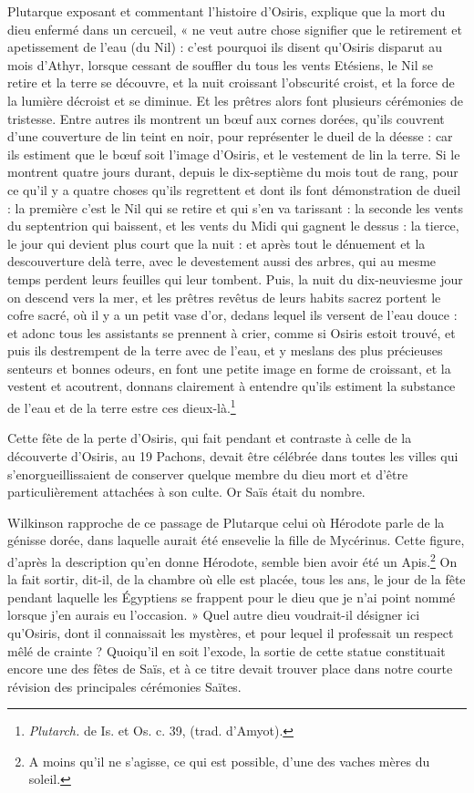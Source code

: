 \documentclass[a4paper, 11pt, oneside]{article}
\begin{document}
Plutarque exposant et commentant l'histoire d'Osiris, explique que la mort du dieu enfermé dans un cercueil, « ne veut autre chose signifier que le retirement et apetissement de l'eau (du Nil) : c'est pourquoi ils disent qu'Osiris disparut au mois d'Athyr, lorsque cessant de souffler du tous les vents Etésiens, le Nil se retire et la terre se découvre, et la nuit croissant l'obscurité croist, et la force de la lumière décroist et se diminue. Et les prêtres alors font plusieurs cérémonies de tristesse. Entre autres ils montrent un bœuf aux cornes dorées, qu'ils couvrent d'une couverture de lin teint en noir, pour représenter le dueil de la déesse : car ils estiment que le bœuf soit l'image d'Osiris, et le vestement de lin la terre. Si le montrent quatre jours durant, depuis le dix-septième du mois tout de rang, pour ce qu'il y a quatre choses qu'ils regrettent et dont ils font démonstration de dueil : la première c'est le Nil qui se retire et qui s'en va tarissant : la seconde les vents du septentrion qui baissent, et les vents du Midi qui gagnent le dessus : la tierce, le jour qui devient plus court que la nuit : et après tout le dénuement et la descouverture delà terre, avec le devestement aussi des arbres, qui au mesme temps perdent leurs feuilles qui leur tombent. Puis, la nuit du dix-neuviesme jour on descend vers la mer, et les prêtres revêtus de leurs habits sacrez portent le cofre sacré, où il y a un petit vase d'or, dedans lequel ils versent de l'eau douce : et adonc tous les assistants se prennent à crier, comme si Osiris estoit trouvé, et puis ils destrempent de la terre avec de l'eau, et y meslans des plus précieuses senteurs et bonnes odeurs, en font une petite image en forme de croissant, et la vestent et acoutrent, donnans clairement à entendre qu'ils estiment la substance de l'eau et de la terre estre ces dieux-là.\footnote{\emph{Plutarch.} de Is. et Os. c. 39, (trad. d'Amyot).}

Cette fête de la perte d'Osiris, qui fait pendant et contraste à celle de la découverte d'Osiris, au 19 Pachons, devait être célébrée dans toutes les villes qui s'enorgueillissaient de conserver quelque membre du dieu mort et d'être particulièrement attachées à son culte. Or Saïs était du nombre.

Wilkinson rapproche de ce passage de Plutarque celui où Hérodote parle de la génisse dorée, dans laquelle aurait été ensevelie la fille de Mycérinus. Cette figure, d'après la description qu'en donne Hérodote, semble bien avoir été un Apis.\footnote{A moins qu'il ne s'agisse, ce qui est possible, d'une des vaches mères du soleil.} On la fait sortir, dit-il, de la chambre où elle est placée, tous les ans, le jour de la fête pendant laquelle les Égyptiens se frappent pour le dieu que je n'ai point nommé lorsque j'en aurais eu l'occasion. » Quel autre dieu voudrait-il désigner ici qu'Osiris, dont il connaissait les mystères, et pour lequel il professait un respect mêlé de crainte ? Quoiqu'il en soit l'exode, la sortie de cette statue constituait encore une des fêtes de Saïs, et à ce titre devait trouver place dans notre courte révision des principales cérémonies Saïtes.
\end{document}
